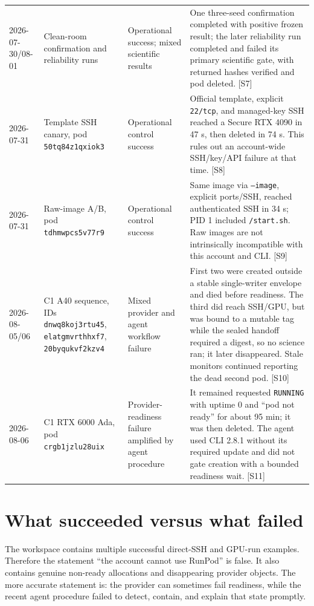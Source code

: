 \documentclass[10pt]{article}
\begin{document}
\begin{longtable}{p{}p{}p{}p{}}
2026-07-30/08-01 & Clean-room confirmation and reliability runs & Operational success; mixed scientific results & One three-seed confirmation completed with positive frozen result; the later reliability run completed and failed its primary scientific gate, with returned hashes verified and pod deleted. [S7] \\
2026-07-31 & Template SSH canary, pod \texttt{50tq84z1qxiok3} & Operational control success & Official template, explicit \texttt{22/tcp}, and managed-key SSH reached a Secure RTX 4090 in 47 s, then deleted in 74 s. This rules out an account-wide SSH/key/API failure at that time. [S8] \\
2026-07-31 & Raw-image A/B, pod \texttt{tdhmwpcs5v77r9} & Operational control success & Same image via \texttt{--image}, explicit ports/SSH, reached authenticated SSH in 34 s; PID 1 included \texttt{/start.sh}. Raw images are not intrinsically incompatible with this account and CLI. [S9] \\
2026-08-05/06 & C1 A40 sequence, IDs \texttt{dnwq8koj3rtu45}, \texttt{elatgmvrthhxf7}, \texttt{20byqukvf2kzv4} & Mixed provider and agent workflow failure & First two were created outside a stable single-writer envelope and died before readiness. The third did reach SSH/GPU, but was bound to a mutable tag while the sealed handoff required a digest, so no science ran; it later disappeared. Stale monitors continued reporting the dead second pod. [S10] \\
2026-08-06 & C1 RTX 6000 Ada, pod \texttt{crgb1jzlu28uix} & Provider-readiness failure amplified by agent procedure & It remained requested \texttt{RUNNING} with uptime 0 and ``pod not ready'' for about 95 min; it was then deleted. The agent used CLI 2.8.1 without its required update and did not gate creation with a bounded readiness wait. [S11] \\
\bottomrule
\end{longtable}
\normalsize

\section*{What succeeded versus what failed}

The workspace contains multiple successful direct-SSH and GPU-run examples.
Therefore the statement ``the account cannot use RunPod'' is false.  It also
contains genuine non-ready allocations and disappearing provider objects. The
more accurate statement is: the provider can sometimes fail readiness, while
the recent agent procedure failed to detect, contain, and explain that state
promptly.
\end{document}

